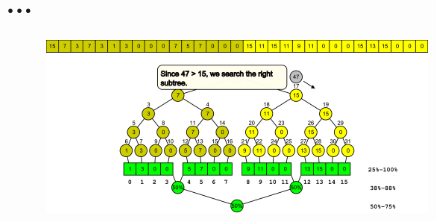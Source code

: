 \chapter{...}

\begin{figure}
    \centering
    
    \includegraphics[width=0.9\textwidth]{figures/screenshots/2014-04-30 14-19-57.pdf}
\end{figure}